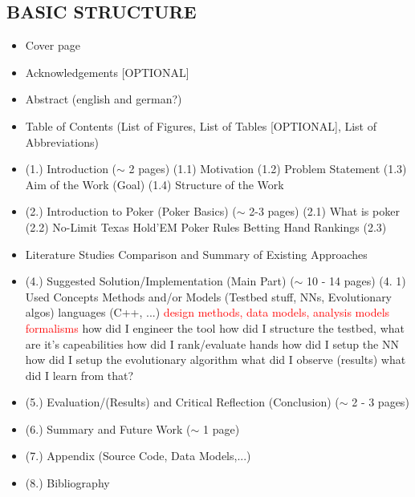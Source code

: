 \subsection{BASIC STRUCTURE}
\begin{itemize}
\item Cover page
\item Acknowledgements [OPTIONAL]
\item Abstract (english and german?)
\item Table of Contents (List of Figures, List of Tables [OPTIONAL], List of Abbreviations)
\item (1.) Introduction ($\sim$ 2 pages)
\subitem (1.1) Motivation
\subitem (1.2) Problem Statement
\subitem (1.3) Aim of the Work (Goal)
\subitem (1.4) Structure of the Work
\item (2.) Introduction to Poker (Poker Basics) ($\sim$ 2-3 pages)
\subitem (2.1) What is poker
\subitem (2.2) No-Limit Texas Hold'EM
\subsubitem Poker Rules
\subsubitem Betting
\subsubitem Hand Rankings
\subitem (2.3) 
\item {} 
\subitem Literature Studies
\subitem Comparison and Summary of Existing Approaches
\item (4.) Suggested Solution/Implementation (Main Part) ($\sim$ 10 - 14 pages)
\subitem (4. 1)
\subsubitem Used Concepts 
\subsubitem Methods and/or Models (Testbed stuff, NNs, Evolutionary algos)
\subsubitem languages (C++, ...)
\subsubitem \textcolor{red}{design methods, data models, analysis models}
\subsubitem \textcolor{red}{formalisms}
\subitem how did I engineer the tool
\subitem how did I structure the testbed, what are it's capeabilities
\subitem how did I rank/evaluate hands
\subitem how did I setup the NN
\subitem how did I setup the evolutionary algorithm
\subitem what did I observe (results)
\subitem what did I learn from that?
\item (5.) Evaluation/(Results) and Critical Reflection (Conclusion) ($\sim$ 2 - 3 pages)
\item (6.) Summary and Future Work ($\sim$ 1 page)
\item (7.) Appendix (Source Code, Data Models,...)
\item (8.) Bibliography
\end{itemize}
\pagebreak
